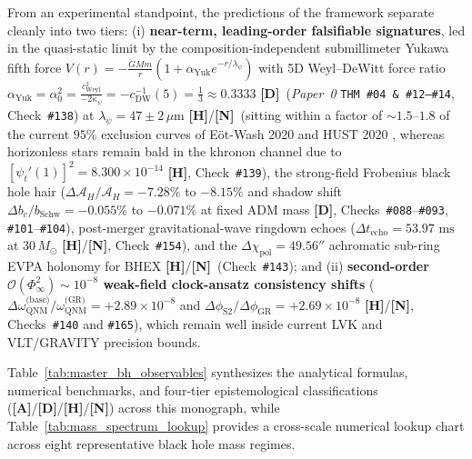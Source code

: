 \documentclass[11pt,a4paper]{article}
\newcommand{\catA}{\textbf{\textcolor{purple!80!black}{[A]}}}
\newcommand{\catD}{\textbf{\textcolor{blue!75!black}{[D]}}}
\newcommand{\catH}{\textbf{\textcolor{orange!85!black}{[H]}}}
\newcommand{\catN}{\textbf{\textcolor{teal!75!black}{[N]}}}
\theoremstyle{plain}
\theoremstyle{definition}
\theoremstyle{remark}
\numberwithin{equation}{section}
\begin{document}
From an experimental standpoint, the predictions of the framework separate cleanly into two tiers: (i) \textbf{near-term, leading-order falsifiable signatures}, led in the quasi-static limit by the composition-independent submillimeter Yukawa fifth force $V(r) = -\frac{GMm}{r}(1 + \alpha_{\text{Yuk}}e^{-r/\lambda_{\psi}})$ with 5D Weyl--DeWitt force ratio $\alpha_{\text{Yuk}} = \alpha_0^2 = \frac{c_{\text{Weyl}}^2}{-2\kappa_{\psi}} = -c_{\text{DW}}^{-1}(5) = \frac{1}{3} \approx 0.3333$ \catD\ (\textit{Paper~0} \texttt{THM~\#04 \& \#12--\#14}, Check~\texttt{\#138}) at $\lambda_{\psi} = 47 \pm 2\,\mu\text{m}$ \catH/\catN\ (sitting within a factor of $\sim 1.5\text{--}1.8$ of the current $95\%$ exclusion curves of E\"ot-Wash 2020 \cite{lee2020_eotwash} and HUST 2020 \cite{tan2020_hust}, whereas horizonless stars remain bald in the khronon channel due to $[\psi_t'(1)]^2 = 8.300 \times 10^{-14}$ \catH, Check~\texttt{\#139}), the strong-field Frobenius black hole hair ($\Delta\mathcal{A}_H/\mathcal{A}_H = -7.28\%$ to $-8.15\%$ and shadow shift $\Delta b_c/b_{\text{Schw}} = -0.055\%$ to $-0.071\%$ at fixed ADM mass \catD, Checks~\texttt{\#088}--\texttt{\#093}, \texttt{\#101}--\texttt{\#104}), post-merger gravitational-wave ringdown echoes ($\Delta t_{\text{echo}} = 53.97\text{ ms}$ at $30\,M_{\odot}$ \catH/\catN, Check~\texttt{\#154}), and the $\Delta\chi_{\text{pol}} = 49.56''$ achromatic sub-ring EVPA holonomy for BHEX \catH/\catN\ (Check~\texttt{\#143}); and (ii) \textbf{second-order $\mathcal{O}(\Phi_{\infty}^2) \sim 10^{-8}$ weak-field clock-ansatz consistency shifts} ($\Delta\omega_{\text{QNM}}^{\text{(base)}}/\omega_{\text{QNM}}^{\text{(GR)}} = +2.89 \times 10^{-8}$ and $\Delta\phi_{\text{S2}}/\Delta\phi_{\text{GR}} = +2.69 \times 10^{-8}$ \catH/\catN, Checks~\texttt{\#140} and \texttt{\#165}), which remain well inside current LVK and VLT/GRAVITY precision bounds.

Table~\ref{tab:master_bh_observables} synthesizes the analytical formulas, numerical benchmarks, and four-tier epistemological classifications (\catA/\catD/\catH/\catN) across this monograph, while Table~\ref{tab:mass_spectrum_lookup} provides a cross-scale numerical lookup chart across eight representative black hole mass regimes.
\end{document}
